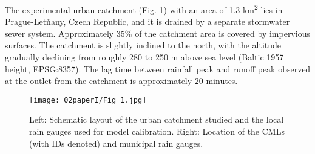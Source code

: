 \documentclass{ctuthesis}\usepackage[]{graphicx}\usepackage[]{color}
\begin{document}
The experimental urban catchment (Fig. \ref{2fig1}) with an area of 1.3 km\textsuperscript{2} lies in Prague-Letňany, Czech Republic, and it is drained by a separate stormwater sewer system. Approximately 35\% of the catchment area is covered by impervious surfaces. The catchment is slightly inclined to the north, with the altitude gradually declining from roughly 280 to 250 m above sea level (Baltic 1957 height, EPSG:8357). The lag time between rainfall peak and runoff peak observed at the outlet from the catchment is approximately 20 minutes.


\begin{figure}[p]
\begin{center}
\texttt{[image: 02paperI/Fig 1.jpg]}
\caption{Left: Schematic layout of the urban catchment studied and the local rain gauges used for model calibration. Right: Location of the CMLs (with IDs denoted) and municipal rain gauges.} \label{2fig1}
\end{center}
\end{figure}
\end{document}
